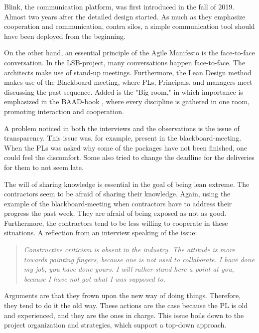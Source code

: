 Blink, the communication platform, was first introduced in the fall of 2019. Almost two years after the detailed design started. As much as they emphasize cooperation and communication, contra silos, a simple communication tool should have been deployed from the beginning. 

On the other hand, an essential principle of the Agile Manifesto is the face-to-face conversation. In the LSB-project, many conversations happen face-to-face. The architects make use of stand-up meetings. Furthermore, the Lean Design method makes use of the Blackboard-meeting, where PLs, Principals, and managers meet discussing the past sequence. Added is the "Big room," in which importance is emphasized in the BAAD-book \cite{lean_i_praksis}, where every discipline is gathered in one room, promoting interaction and cooperation. 

A problem noticed in both the interviews and the observations is the issue of transparency. This issue was, for example, present in the blackboard-meeting. When the PLs was asked why some of the packages have not been finished, one could feel the discomfort. Some also tried to change the deadline for the deliveries for them to not seem late. 

The will of sharing knowledge is essential in the goal of being lean extreme. The contractors seem to be afraid of sharing their knowledge. Again, using the example of the blackboard-meeting when contractors have to address their progress the past week. They are afraid of being exposed as not as good. Furthermore, the contractors tend to be less willing to cooperate in these situations. A reflection from an interview speaking of the issue:
\begin{quote}
    \textit{Constructive criticism is absent in the industry. The attitude is more towards pointing fingers, because one is not used to collaborate. I have done my job, you have done yours. I will rather stand here a point at you, because I have not got what I was supposed to.}
\end{quote}

Arguments are that they frown upon the new way of doing things. Therefore, they tend to do it the old way. These actions are the case because the PL is old and experienced, and they are the ones in charge. This issue boils down to the project organization and strategies, which support a top-down approach. 

